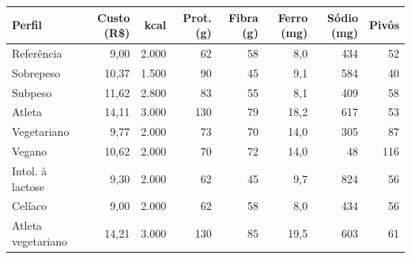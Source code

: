 \begin{tabular}{lrrrrrrr}
\toprule
Perfil & Custo (R\$) & kcal & Prot. (g) & Fibra (g) & Ferro (mg) & Sódio (mg) & Pivôs \\
\midrule
Referência & 9{,}00 & 2.000 & 62 & 58 & 8{,}0 & 434 & 52 \\
Sobrepeso & 10{,}37 & 1.500 & 90 & 45 & 9{,}1 & 584 & 40 \\
Subpeso & 11{,}62 & 2.800 & 83 & 55 & 8{,}1 & 409 & 58 \\
Atleta & 14{,}11 & 3.000 & 130 & 79 & 18{,}2 & 617 & 53 \\
Vegetariano & 9{,}77 & 2.000 & 73 & 70 & 14{,}0 & 305 & 87 \\
Vegano & 10{,}62 & 2.000 & 70 & 72 & 14{,}0 & 48 & 116 \\
Intol. à lactose & 9{,}30 & 2.000 & 62 & 45 & 9{,}7 & 824 & 56 \\
Celíaco & 9{,}00 & 2.000 & 62 & 58 & 8{,}0 & 434 & 56 \\
Atleta vegetariano & 14{,}21 & 3.000 & 130 & 85 & 19{,}5 & 603 & 61 \\
\bottomrule
\end{tabular}
